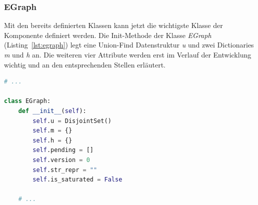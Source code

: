 \subsubsection{EGraph}

Mit den bereits definierten Klassen kann jetzt die wichtigste Klasse der Komponente definiert werden. Die Init-Methode der Klasse \textit{EGraph} (Listing~\ref{lst:egraph})
legt eine Union-Find Datenstruktur \textit{u} und zwei Dictionaries \textit{m} und \textit{h} an. Die weiteren vier Attribute werden erst im Verlauf der Entwicklung wichtig und 
an den entsprechenden Stellen erläutert.

\begin{lstlisting}[language=Python, caption=Auszug aus der Klasse \textit{EGraph}, label={lst:egraph}]
# ... 

class EGraph:
    def __init__(self):
        self.u = DisjointSet()
        self.m = {}
        self.h = {}
        self.pending = []
        self.version = 0
        self.str_repr = ""
        self.is_saturated = False

    # ...
\end{lstlisting} 






